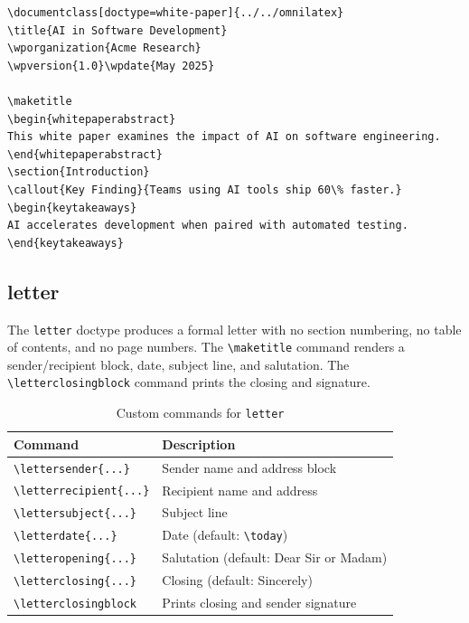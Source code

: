 \begin{verbatim}
\documentclass[doctype=white-paper]{../../omnilatex}
\title{AI in Software Development}
\wporganization{Acme Research}
\wpversion{1.0}\wpdate{May 2025}

\maketitle
\begin{whitepaperabstract}
This white paper examines the impact of AI on software engineering.
\end{whitepaperabstract}
\section{Introduction}
\callout{Key Finding}{Teams using AI tools ship 60\% faster.}
\begin{keytakeaways}
AI accelerates development when paired with automated testing.
\end{keytakeaways}

\end{verbatim}

\subsection{letter}

The \texttt{letter} doctype produces a formal letter with no section
numbering, no table of contents, and no page numbers.  The
\texttt{\textbackslash maketitle} command renders a sender/recipient block,
date, subject line, and salutation.  The
\texttt{\textbackslash letterclosingblock} command prints the closing and
signature.

\begin{table}[htbp]
    \centering
    \caption{Custom commands for \texttt{letter}}
    \label{tab:letter-commands}
    \begin{tabular}{@{} l p{8cm} @{}}
        \toprule
        \textbf{Command} & \textbf{Description} \\
        \midrule
        \texttt{\textbackslash lettersender\{...\}}    & Sender name and address block \\
        \texttt{\textbackslash letterrecipient\{...\}}  & Recipient name and address \\
        \texttt{\textbackslash lettersubject\{...\}}    & Subject line \\
        \texttt{\textbackslash letterdate\{...\}}       & Date (default: \texttt{\textbackslash today}) \\
        \texttt{\textbackslash letteropening\{...\}}    & Salutation (default: Dear Sir or Madam) \\
        \texttt{\textbackslash letterclosing\{...\}}    & Closing (default: Sincerely) \\
        \texttt{\textbackslash letterclosingblock}      & Prints closing and sender signature \\
        \bottomrule
    \end{tabular}
\end{table}

